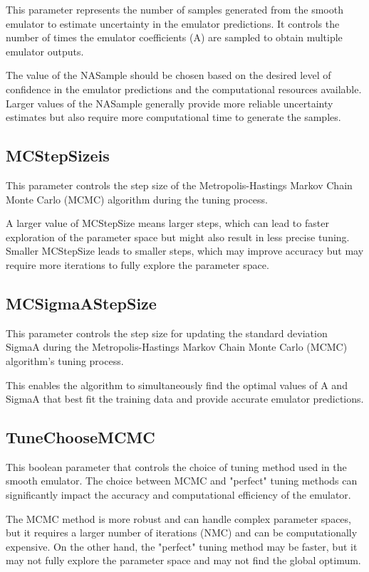 \documentclass[12pt]{article}
\numberwithin{equation}{section}
\numberwithin{figure}{section}
\begin{document}
This parameter represents the number of samples generated from the smooth emulator to estimate uncertainty in the emulator predictions. It controls the number of times the emulator coefficients (A) are sampled to obtain multiple emulator outputs.

The value of the NASample should be chosen based on the desired level of confidence in the emulator predictions and the computational resources available. Larger values of the NASample generally provide more reliable uncertainty estimates but also require more computational time to generate the samples.  


\subsection{MCStepSizeis}
 This parameter controls the step size of the Metropolis-Hastings Markov Chain Monte Carlo (MCMC) algorithm during the tuning process.
 
A larger value of MCStepSize means larger steps, which can lead to faster exploration of the parameter space but might also result in less precise tuning. Smaller MCStepSize leads to smaller steps, which may improve accuracy but may require more iterations to fully explore the parameter space.

\subsection{MCSigmaAStepSize}
 This parameter controls the step size for updating the standard deviation SigmaA during the Metropolis-Hastings Markov Chain Monte Carlo (MCMC) algorithm's tuning process. 

This enables the algorithm to simultaneously find the optimal values of A and SigmaA that best fit the training data and provide accurate emulator predictions.


 
\subsection{TuneChooseMCMC}

This boolean parameter that controls the choice of tuning method used in the smooth emulator. The choice between MCMC and "perfect" tuning methods can significantly impact the accuracy and computational efficiency of the emulator.

The MCMC method is more robust and can handle complex parameter spaces, but it requires a larger number of iterations (NMC) and can be computationally expensive. On the other hand, the "perfect" tuning method may be faster, but it may not fully explore the parameter space and may not find the global optimum. \\
\end{document}
